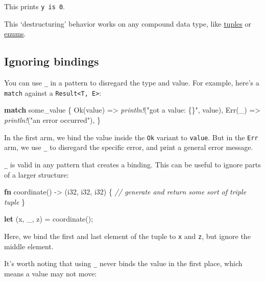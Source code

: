 \documentclass[a4paper,]{book}
\newenvironment{Shaded}{\begin{snugshade}}{\end{snugshade}}
\newcommand{\KeywordTok}[1]{\textcolor[rgb]{0.13,0.29,0.53}{\textbf{{#1}}}}
\newcommand{\DataTypeTok}[1]{\textcolor[rgb]{0.13,0.29,0.53}{{#1}}}
\newcommand{\ConstantTok}[1]{\textcolor[rgb]{0.00,0.00,0.00}{{#1}}}
\newcommand{\StringTok}[1]{\textcolor[rgb]{0.31,0.60,0.02}{{#1}}}
\newcommand{\CommentTok}[1]{\textcolor[rgb]{0.56,0.35,0.01}{\textit{{#1}}}}
\newcommand{\PreprocessorTok}[1]{\textcolor[rgb]{0.56,0.35,0.01}{\textit{{#1}}}}
\newcommand{\NormalTok}[1]{{#1}}
\begin{document}
This prints \texttt{y\ is\ 0}.

This `destructuring' behavior works on any compound data type, like
\protect\hyperlink{tuples}{tuples} or
\protect\hyperlink{sec--enums}{enums}.

\subsection{Ignoring bindings}\label{ignoring-bindings}

You can use \texttt{\_} in a pattern to disregard the type and value.
For example, here's a \texttt{match} against a
\texttt{Result\textless{}T,\ E\textgreater{}}:

\begin{Shaded}
\begin{Highlighting}[]
\KeywordTok{match} \NormalTok{some_value \{}
    \ConstantTok{Ok}\NormalTok{(value) => }\PreprocessorTok{println!}\NormalTok{(}\StringTok{"got a value: \{\}"}\NormalTok{, value),}
    \ConstantTok{Err}\NormalTok{(_) => }\PreprocessorTok{println!}\NormalTok{(}\StringTok{"an error occurred"}\NormalTok{),}
\NormalTok{\}}
\end{Highlighting}
\end{Shaded}

In the first arm, we bind the value inside the \texttt{Ok} variant to
\texttt{value}. But in the \texttt{Err} arm, we use \texttt{\_} to
disregard the specific error, and print a general error message.

\texttt{\_} is valid in any pattern that creates a binding. This can be
useful to ignore parts of a larger structure:

\begin{Shaded}
\begin{Highlighting}[]
\KeywordTok{fn} \NormalTok{coordinate() -> (}\DataTypeTok{i32}\NormalTok{, }\DataTypeTok{i32}\NormalTok{, }\DataTypeTok{i32}\NormalTok{) \{}
    \CommentTok{// generate and return some sort of triple tuple}
\NormalTok{\}}

\KeywordTok{let} \NormalTok{(x, _, z) = coordinate();}
\end{Highlighting}
\end{Shaded}

Here, we bind the first and last element of the tuple to \texttt{x} and
\texttt{z}, but ignore the middle element.

It's worth noting that using \texttt{\_} never binds the value in the
first place, which means a value may not move:
\end{document}
